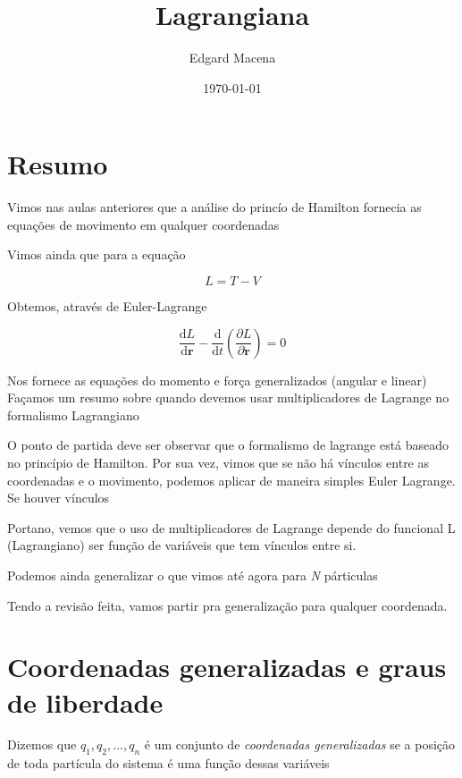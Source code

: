 \documentclass[11pt]{article}
\author{Edgard Macena}
\date{\today}
\title{Lagrangiana}
\begin{document}
\maketitle
\tableofcontents



\section{Resumo}
\label{sec:orgeddcf4e}
Vimos nas aulas anteriores que a análise do princío de Hamilton fornecia as equações de movimento em qualquer coordenadas

Vimos ainda que para a equação

\begin{equation}
  L = T - V
\end{equation}

Obtemos, através de Euler-Lagrange

\begin{equation}\label{eq:Euler-Lagrange}
\frac{\mathrm{d}L}{\mathrm{d}\mathbf{r}} - \frac{\mathrm{d}}{\mathrm{d}t}\left(\dfrac{\partial L}{\partial \mathbf{\dot{r}}}\right) = 0
\end{equation}

Nos fornece as equações do momento e força generalizados (angular e linear)
Façamos um resumo sobre quando devemos usar multiplicadores de Lagrange no
formalismo Lagrangiano

O ponto de partida deve ser observar que o formalismo de lagrange está
baseado no princípio de Hamilton. Por sua vez, vimos que se não há vínculos
entre as coordenadas e o movimento, podemos aplicar de maneira simples Euler
Lagrange. Se houver vínculos

Portano, vemos que o uso de multiplicadores de Lagrange depende do funcional
L (Lagrangiano) ser função de variáveis que tem vínculos entre si.

Podemos ainda generalizar o que vimos até agora para \emph{N} párticulas

Tendo a revisão feita, vamos partir pra generalização para qualquer
coordenada.


\section{Coordenadas generalizadas e graus de liberdade}
\label{sec:org880bb42}
Dizemos que \(q_1, q_2, ..., q_n\) é um conjunto de \emph{coordenadas generalizadas} se
a posição de toda partícula do sistema é uma função dessas variáveis
\end{document}
